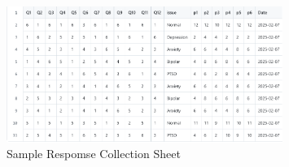 \begin{figure}[h!]  
    \centering
    \includegraphics[width=0.8\textwidth]{App Images/32 Interface.png}  
    \caption{Sample Respomse Collection Sheet}
    \label{01i}  %
\end{figure}


\pagebreak

